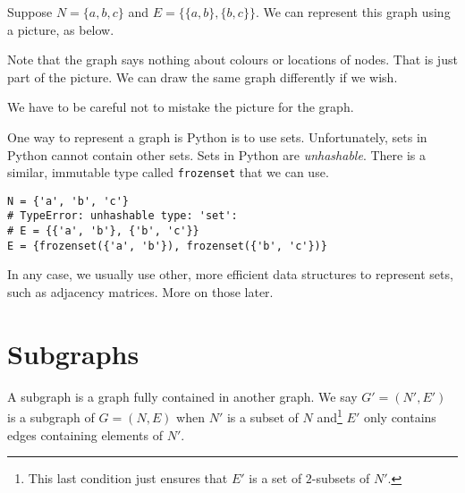 \documentclass{iansnotes}
\begin{document}
  Suppose $N = \{ a, b, c \}$ and $E = \{ \{a,b\}, \{b,c\} \}$.
  We can represent this graph using a picture, as below.
  \begin{center}
  \end{center}
  Note that the graph says nothing about colours or locations of nodes.
  That is just part of the picture.
  We can draw the same graph differently if we wish.
  \begin{center}
  \end{center}
  We have to be careful not to mistake the picture for the graph.

  One way to represent a graph is Python is to use sets.
  Unfortunately, sets in Python cannot contain other sets.
  Sets in Python are \emph{unhashable}.
  There is a similar, immutable type called \texttt{frozenset} that we can use.
  \begin{verbatim}
N = {'a', 'b', 'c'}
# TypeError: unhashable type: 'set':
# E = {{'a', 'b'}, {'b', 'c'}}
E = {frozenset({'a', 'b'}), frozenset({'b', 'c'})}
  \end{verbatim}
  In any case, we usually use other, more efficient data structures to represent sets, such as adjacency matrices.
  More on those later.

\section{Subgraphs}
  A subgraph is a graph fully contained in another graph.
  We say $G' = (N', E')$ is a subgraph of $G = (N, E)$ when $N'$ is a subset of $N$ and\footnote{This last condition just ensures that $E'$ is a set of $2$-subsets of $N'$.} $E'$ only contains edges containing elements of $N'$.
\end{document}
